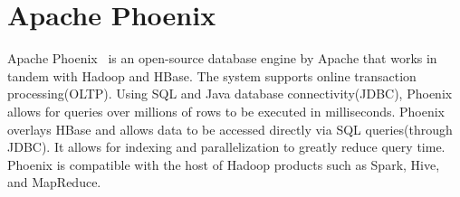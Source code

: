 \section{Apache Phoenix}

Apache Phoenix~\cite{hid-sp18-www-526-apache-phoenix} 
is an open-source database engine by Apache that works 
in tandem with Hadoop and HBase. The system supports online 
transaction  processing(OLTP). Using SQL and Java database 
connectivity(JDBC), Phoenix allows for queries over millions of rows 
to be executed in milliseconds. Phoenix overlays HBase and allows 
data to be accessed directly via SQL queries(through JDBC). It allows
for indexing and parallelization to greatly reduce query time. Phoenix
is compatible with the host of Hadoop products such as Spark, Hive, 
and MapReduce.
